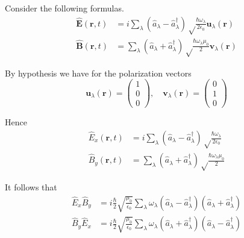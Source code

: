 


\bigskip
Consider the following formulas.
\begin{align*}
\hat{\mathbf E}(\mathbf r,t)
&=i\sum_\lambda\left(\hat a_\lambda-\hat a_\lambda^\dag\right)
\sqrt\frac{\hbar\omega_\lambda}{2\epsilon_0}
\mathbf u_\lambda(\mathbf r)
\tag{15.132}
\\
\hat{\mathbf B}(\mathbf r,t)
&=\sum_\lambda\left(\hat a_\lambda+\hat a_\lambda^\dag\right)
\sqrt\frac{\hbar\omega_\lambda\mu_0}{2}
\mathbf v_\lambda(\mathbf r)
\tag{15.135}
\end{align*}

By hypothesis we have for the polarization vectors
\begin{equation*}
\mathbf u_\lambda(\mathbf r)=\begin{pmatrix}1\\0\\0\end{pmatrix},
\quad
\mathbf v_\lambda(\mathbf r)=\begin{pmatrix}0\\1\\0\end{pmatrix}
\end{equation*}

Hence
\begin{align*}
\hat E_x(\mathbf r,t)
&=i\sum_\lambda\left(\hat a_\lambda-\hat a_\lambda^\dag\right)
\sqrt\frac{\hbar\omega_\lambda}{2\epsilon_0}
\\
\hat B_y(\mathbf r,t)
&=\sum_\lambda\left(\hat a_\lambda+\hat a_\lambda^\dag\right)
\sqrt\frac{\hbar\omega_\lambda\mu_0}{2}
\end{align*}

It follows that
\begin{align*}
\hat E_x\hat B_y&=i\frac{\hbar}{2}\sqrt{\frac{\mu_0}{\epsilon_0}}\sum_\lambda\omega_\lambda
\left(\hat a_\lambda-\hat a_\lambda^\dag\right)
\left(\hat a_\lambda+\hat a_\lambda^\dag\right)
\tag{1}
\\
\hat B_y\hat E_x&=i\frac{\hbar}{2}\sqrt{\frac{\mu_0}{\epsilon_0}}\sum_\lambda\omega_\lambda
\left(\hat a_\lambda+\hat a_\lambda^\dag\right)
\left(\hat a_\lambda-\hat a_\lambda^\dag\right)
\tag{2}
\end{align*}

